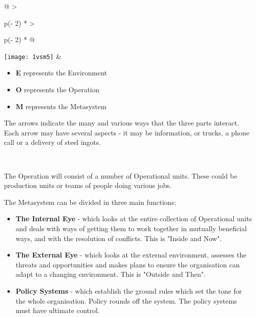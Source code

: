 \begin{longtable}[]{@{}
        >{\raggedright\arraybackslash}p{(\columnwidth - 2\tabcolsep) * }
        >{\raggedright\arraybackslash}p{(\columnwidth - 2\tabcolsep) * }@{}}
    \texttt{[image: 1vsm5]}
    & \begin{minipage}[b]{\linewidth}\raggedright
        \begin{itemize}
            \item \textcolor{E}{\textbf{E}} represents the Environment
            \item \textcolor{O}{\textbf{O}} represents the Operation
            \item \textcolor{M}{\textbf{M}} represents the Metasystem
        \end{itemize}
    \vspace{\baselineskip}
    The arrows indicate the many and various ways that the three parts interact. Each arrow may have several aspects - it may be information, or trucks, a phone call or a delivery of steel ingots.
    \end{minipage} \\
\end{longtable}

The Operation will consist of a number of Operational units. These could be production units or teams of people doing various jobs.

The Metasystem can be divided in three main functions:

\begin{itemize}
  \item \textbf{The Internal Eye} - which looks at the entire collection of Operational units and deals with ways of getting them to work together in mutually beneficial ways, and with the resolution of conflicts. This is "Inside and Now".

  \item \textbf{The External Eye} - which looks at the external environment, assesses the threats and opportunities and makes plans to ensure the organisation can adapt to a changing environment. This is "Outside and Then".

  \item \textbf{Policy Systems} - which establish the ground rules which set the tone for the whole organisation. Policy rounds off the system. The policy systems must have ultimate control.

\end{itemize}

